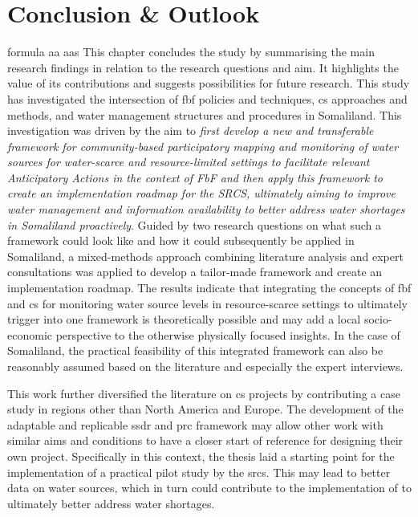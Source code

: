 \chapter{Conclusion \& Outlook}

\label{chapter6}
\gls{formula}
\gls{aa}
\glspl{aa}
This chapter concludes the study by summarising the main research findings in relation to the research questions and aim. It highlights the value of its contributions and suggests possibilities for future research.\newline
This study has investigated the intersection of \acrfull{fbf} policies and techniques, \acrfull{cs} approaches and methods, and water management structures and procedures in Somaliland. This investigation was driven by the aim to \textit{first develop a new and transferable framework for community-based participatory mapping and monitoring of water sources for water-scarce and resource-limited settings to facilitate relevant Anticipatory Actions in the context of FbF and then apply this framework to create an implementation roadmap for the SRCS, ultimately aiming to improve water management and information availability to better address water shortages in Somaliland proactively}.\newline
Guided by two research questions on what such a framework could look like and how it could subsequently be applied in Somaliland, a mixed-methods approach combining literature analysis and expert consultations was applied to develop a tailor-made framework and create an implementation roadmap. The results indicate that integrating the concepts of \acrshort{fbf} and \acrshort{cs} for monitoring water source levels in resource-scarce settings to ultimately trigger  into one framework is theoretically possible and may add a local socio-economic perspective to the otherwise physically focused insights. In the case of Somaliland, the practical feasibility of this integrated framework can also be reasonably assumed based on the literature and especially the expert interviews.\newline

This work further diversified the literature on \acrlong{cs} projects by contributing a case study in regions other than North America and Europe. The development of the adaptable and replicable \acrlong{ssdr} and \acrlong{prc} framework may allow other work with similar aims and conditions to have a closer start of reference for designing their own project. Specifically in this context, the thesis laid a starting point for the implementation of a practical pilot study by the \acrlong{srcs}. This may lead to better data on water sources, which in turn could contribute to the implementation of  to ultimately better address water shortages.\newline

